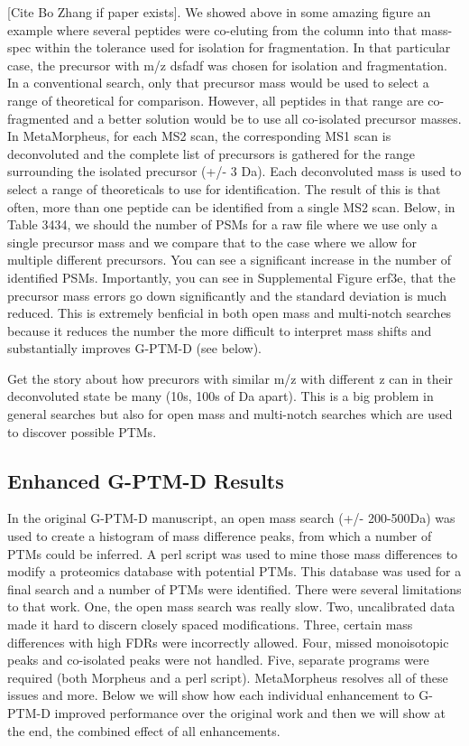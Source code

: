 \documentclass[journal=jprobs,manuscript=article]{achemso}
\begin{document}
[Cite Bo Zhang if paper exists].
We showed above in some amazing figure an example where several peptides were co-eluting from the column into that mass-spec within the tolerance used for isolation for fragmentation.
In that particular case, the precursor with m/z dsfadf was chosen for isolation and fragmentation.
In a conventional search, only that precursor mass would be used to select a range of theoretical for comparison.
However, all peptides in that range are co-fragmented and a better solution would be to use all co-isolated precursor masses.
In MetaMorpheus, for each MS2 scan, the corresponding MS1 scan is deconvoluted and the complete list of precursors is gathered for the range surrounding the isolated precursor (+/- 3 Da).
Each deconvoluted mass is used to select a range of theoreticals to use for identification.
The result of this is that often, more than one peptide can be identified from a single MS2 scan.
Below, in Table 3434, we should the number of PSMs for a raw file where we use only a single precursor mass and we compare that to the case where we allow for multiple different precursors.
You can see a significant increase in the number of identified PSMs.
Importantly, you can see in Supplemental Figure erf3e, that the precursor mass errors go down significantly and the standard deviation is much reduced.
This is extremely benficial in both open mass and multi-notch searches because it reduces the number the more difficult to interpret mass shifts and substantially improves G-PTM-D (see below).

Get the story about how precurors with similar m/z with different z can in their deconvoluted state be many (10s, 100s of Da apart).
This is a big problem in general searches but also for open mass and multi-notch searches which are used to discover possible PTMs. 

\subsection{Enhanced G-PTM-D Results}

In the original G-PTM-D manuscript, an open mass search (+/- 200-500Da) was used to create a histogram of mass difference peaks, from which a number of PTMs could be inferred.
A perl script was used to mine those mass differences to modify a proteomics database with potential PTMs.
This database was used for a final search and a number of PTMs were identified.
There were several limitations to that work.
One, the open mass search was really slow.
Two, uncalibrated data made it hard to discern closely spaced modifications.
Three, certain mass differences with high FDRs were incorrectly allowed.
Four, missed monoisotopic peaks and co-isolated peaks were not handled.
Five, separate programs were required (both Morpheus and a perl script).
MetaMorpheus resolves all of these issues and more.
Below we will show how each individual enhancement to G-PTM-D improved performance over the original work and then we will show at the end, the combined effect of all enhancements.
\end{document}
